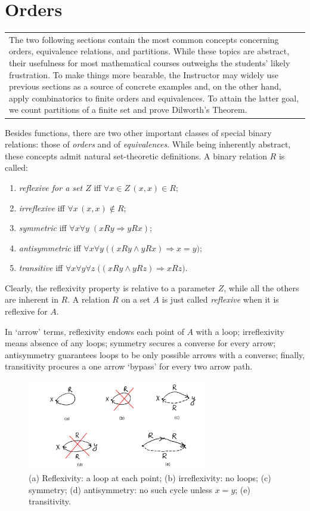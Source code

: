 \documentclass[12pt,notitlepage]{article}
\theoremstyle{plain}
\theoremstyle{definition}
\theoremstyle{plain}
\newcommand{\1}{\mathbf{1}}
\newcommand{\0}{\mathbf{0}}
\newcommand{\ply}{\Longrightarrow}
\newcommand{\mcomm}[1]{
\medskip\noindent\begin{tabular}{| l}
\parbox{0.99\textwidth}{{\small
#1 }}\end{tabular}
\smallskip}
\begin{document}
\section{Orders}\label{sect:orders}
\mcomm{The two following  sections contain the most common concepts concerning orders, equivalence relations, and partitions. While these topics are abstract, their usefulness for most mathematical courses outweighs the students' likely frustration. To make things more bearable, the Instructor may widely use previous sections as a source of concrete examples and, on the other hand, apply combinatorics to finite orders and equivalences. To attain the latter goal, we count partitions of a finite set and prove Dilworth's Theorem.}


Besides functions, there are two other important classes of special binary relations: those of \emph{orders} and of \emph{equivalences}. While being inherently abstract, these concepts admit natural set-theoretic definitions. A binary relation $R$ is called:
\begin{enumerate}
\item \emph{reflexive for a set $Z$} iff $\forall x \in Z\, (x,x) \in R$;
\item \emph{irreflexive} iff $\forall x\, (x,x) \notin R$;
\item \emph{symmetric} iff $\forall x \forall y\; (x R y \ply y R x)$;
\item \emph{antisymmetric} iff $\forall x \forall y\; \bigl( (x R y \wedge y R x) \ply x = y \bigr)$;
\item \emph{transitive} iff $\forall x \forall y \forall z\; \bigl( (x R y \wedge y R z) \ply x R z \bigr)$.
\end{enumerate}
Clearly, the reflexivity property is relative to a parameter $Z$, while all the others are inherent in $R$. A relation $R$ on a set $A$ is just called \emph{reflexive} when it is reflexive for $A$.

In `arrow' terms, reflexivity endows each point of $A$ with a loop; irreflexivity means absence of any loops; symmetry secures a converse for every arrow; antisymmetry guarantees loops to be only possible arrows with a converse; finally, transitivity procures a one arrow `bypass' for every two arrow path.

\begin{figure}[h]
\centering
\includegraphics*[width=0.7\textwidth]{ord_refl.pdf}
\caption{(a) Reflexivity: a loop at each point; (b) irreflexivity: no loops; (c) symmetry; (d) antisymmetry: no such cycle unless $x = y$; (e) transitivity.}
\end{figure}
\end{document}
